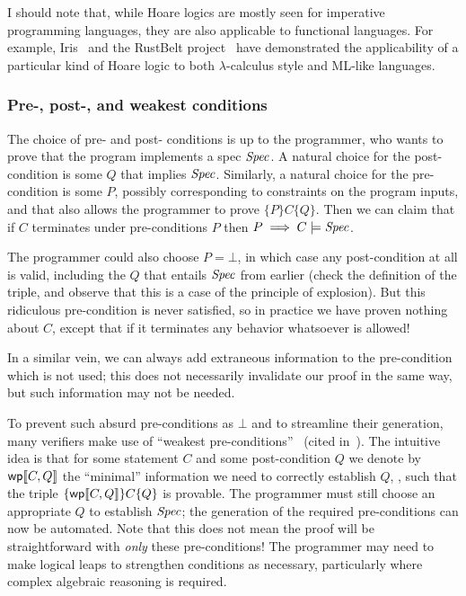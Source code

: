 I should note that, while Hoare logics are mostly seen for imperative
programming languages, they are also applicable to functional languages. For
example, Iris~\cite[\S 5.1]{Krebbers_2017b} and the RustBelt project~\cite[\S
3.2, esp. \figurename~3]{Jung_2018a} have demonstrated the applicability of a
particular kind of Hoare logic to both \(\lambda\)-calculus style and ML-like
languages.

\subsubsection{Pre-, post-, and weakest conditions}

The choice of pre- and post- conditions is up to the programmer, who wants to
prove that the program implements a spec \(\mathit{Spec}\). A natural choice for
the post-condition is some \(Q\) that implies \(\mathit{Spec}\). Similarly, a
natural choice for the pre-condition is some \(P\), possibly corresponding to
constraints on the program inputs, and that also allows the programmer to prove
\(\{P\} C \{Q\}\). Then we can claim that if \(C\) terminates under
pre-conditions \(P\) then \(P \implies C \models \mathit{Spec}\).

The programmer could also choose \(P = \bot\), in which case any post-condition
at all is valid, including the \(Q\) that entails \(\mathit{Spec}\) from earlier
(check the definition of the triple, and observe that this is a case of the
principle of explosion). But this ridiculous pre-condition is never satisfied,
so in practice we have proven nothing about \(C\), except that if it terminates
any behavior whatsoever is allowed!

In a similar vein, we can always add extraneous information to the pre-condition
which is not used; this does not necessarily invalidate our proof in the same
way, but such information may not be needed.

To prevent such absurd pre-conditions as \(\bot\) and to streamline their
generation, many verifiers make use of ``weakest
pre-conditions''~\cite{dijkstra1976discipline,Nelson_1989} (cited
in~\cite{leino2008specification}). The intuitive idea is that for some statement
\(C\) and some post-condition \(Q\) we denote by \(\mathsf{wp}\llbracket C, Q\rrbracket\) the ``minimal''
information we need to correctly establish \(Q\), \ie, such that the triple
\(\{\mathsf{wp}\llbracket C,Q\rrbracket\} C \{Q\}\) is provable. The programmer must still choose an
appropriate \(Q\) to establish \(\mathit{Spec}\); the generation of the required
pre-conditions can now be automated. Note that this does not mean the proof will
be straightforward with \emph{only} these pre-conditions! The programmer may
need to make logical leaps to strengthen conditions as necessary, particularly
where complex algebraic reasoning is required.


